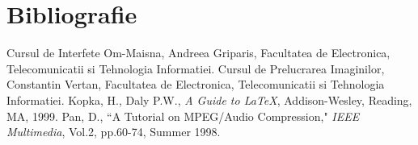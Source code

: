 \section{Bibliografie}

\begin{thebibliography}{100} %
	 Cursul de Interfete Om-Maisna, Andreea Griparis, Facultatea de Electronica, Telecomunicatii si Tehnologia Informatiei.
	 Cursul de Prelucrarea Imaginilor, Constantin Vertan, Facultatea de Electronica, Telecomunicatii si Tehnologia Informatiei.
	 Kopka, H., Daly P.W., \emph{A Guide to LaTeX},
	Addison-Wesley, Reading, MA, 1999.
	 Pan, D., ``A Tutorial on MPEG/Audio Compression," \emph{IEEE
		Multimedia}, Vol.2, pp.60-74, Summer 1998.
\end{thebibliography}